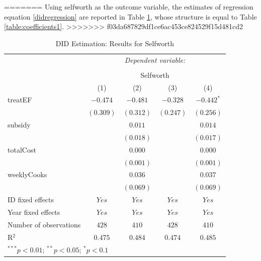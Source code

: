 \documentclass[12pt, a4paper, titlepage]{article}\usepackage[]{graphicx}\usepackage[]{color}
\begin{document}
=======
Using selfworth as the outcome variable, the estimates of regression equation \ref{didregression} are reported in Table \ref{table:coefficients2}, whose structure is equal to Table \ref{table:coefficients1}.
>>>>>>> f03da687829df1ce6ac453ce824529f15d481cd2

\begin{table}
\begin{center}
\begin{tabular}{l c c c c}
\\[-1.8ex]\hline
& \multicolumn{4}{c}{\textit{Dependent variable:}} \\
\cline{2-5}
\\[-1.8ex] & \multicolumn{4}{c}{Selfworth} \\
\hline
 & (1) & (2) & (3) & (4) \\
\hline
treatEF                & $-0.474$  & $-0.481$  & $-0.328$  & $-0.442^{*}$ \\
                       & $(0.309)$ & $(0.312)$ & $(0.247)$ & $(0.256)$    \\
subsidy                &           & $0.011$   &           & $0.014$      \\
                       &           & $(0.018)$ &           & $(0.017)$    \\
totalCost              &           & $0.000$   &           & $0.000$      \\
                       &           & $(0.001)$ &           & $(0.001)$    \\
weeklyCooks            &           & $0.036$   &           & $0.037$      \\
                       &           & $(0.069)$ &           & $(0.069)$    \\
\hline
ID fixed effects       & $Yes$     & $Yes$     & $Yes$     & $Yes$        \\
Year fixed effects     & $Yes$     & $Yes$     & $Yes$     & $Yes$        \\
Number of observations & $428$     & $410$     & $428$     & $410$        \\
R$^2$                  & $0.475$   & $0.484$   & $0.474$   & $0.485$      \\
\hline
\multicolumn{5}{l}{\scriptsize{$^{***}p<0.01$; $^{**}p<0.05$; $^{*}p<0.1$}}
\end{tabular}
\caption{DID Estimation: Results for Selfworth}
\label{table:coefficients2}
\end{center}
\end{table}
\end{document}

